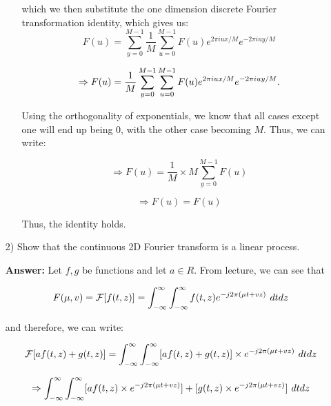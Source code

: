 \documentclass{article}
\begin{document}
\begin{enumerate}
\begin{enumerate}
which we then substitute the one dimension discrete Fourier transformation identity, which gives us:
\begin{equation}
F(u)=\sum_{y=0}^{M-1}\frac{1}{M} \sum_{u=0}^{M-1} F(u) e^{2\pi i u x/M} e^{-2\pi iuy/M}
\end{equation}

\begin{equation}
\Rightarrow F(u)=\frac{1}{M}\sum_{y=0}^{M-1} \sum_{u=0}^{M-1} F(u) e^{2\pi i u x/M} e^{-2\pi iuy/M} \vspace{0.1in} .
\end{equation}

Using the orthogonality of exponentials, we know that all cases except one will end up being $0$, with the other case becoming $M$.  Thus, we can write:

\begin{equation}
\Rightarrow F(u) = \frac{1}{M} \times M \sum_{y=0}^{M-1} F(u)
\end{equation}

\begin{equation}
\Rightarrow F(u) = F(u)
\end{equation}

Thus, the identity holds.

\end{enumerate}

\item[2)] Show that the continuous 2D Fourier transform is a linear process. 

\textbf{Answer:} Let $f,g$ be functions and let $a \in R$. From lecture, we can see that 

\begin{equation}
F(\mu , v) = \mathcal{F}[f(t,z)] = \int_{-\infty}^{\infty} \int_{-\infty}^{\infty} f(t,z)e^{-j2 \pi (\mu t + vz)} \hspace{0.05in} dtdz
\end{equation}

and therefore, we can write:

\begin{equation}
\mathcal{F}[af(t,z) + g(t,z)] = \int_{-\infty}^{\infty} \int_{-\infty}^{\infty} [af(t,z) + g(t,z)] \times e^{-j2 \pi (\mu t + vz)} \hspace{0.05in} dtdz
\end{equation}

\begin{equation}
\Rightarrow \int_{-\infty}^{\infty} \int_{-\infty}^{\infty} [af(t,z) \times e^{-j2 \pi (\mu t + vz)}] + [g(t,z) \times  e^{-j2 \pi (\mu t + vz)}] \hspace{0.05in} dtdz
\end{equation}


\end{enumerate}
\end{document}
